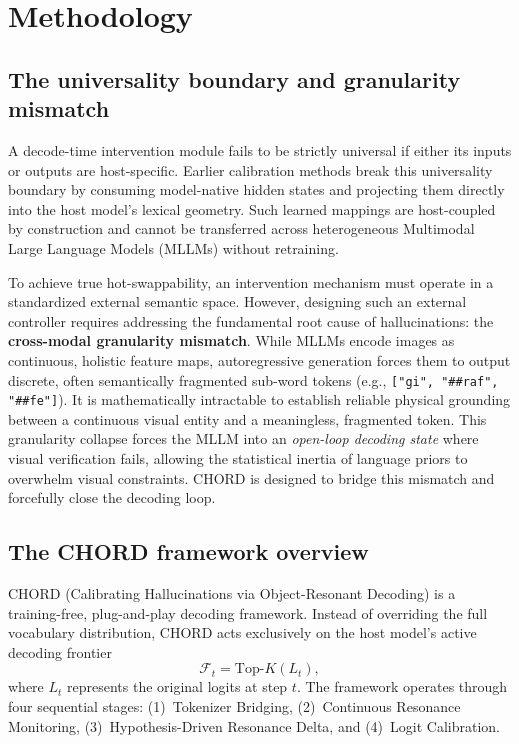\section{Methodology}
\label{sec:method}

\subsection{The universality boundary and granularity mismatch}

A decode-time intervention module fails to be strictly universal if either its inputs or outputs are host-specific. Earlier calibration methods break this universality boundary by consuming model-native hidden states and projecting them directly into the host model's lexical geometry. Such learned mappings are host-coupled by construction and cannot be transferred across heterogeneous Multimodal Large Language Models (MLLMs) without retraining.

To achieve true hot-swappability, an intervention mechanism must operate in a standardized external semantic space. However, designing such an external controller requires addressing the fundamental root cause of hallucinations: the \textbf{cross-modal granularity mismatch}. While MLLMs encode images as continuous, holistic feature maps, autoregressive generation forces them to output discrete, often semantically fragmented sub-word tokens (e.g., \texttt{["gi", "\#\#raf", "\#\#fe"]}). It is mathematically intractable to establish reliable physical grounding between a continuous visual entity and a meaningless, fragmented token. This granularity collapse forces the MLLM into an \emph{open-loop decoding state} where visual verification fails, allowing the statistical inertia of language priors to overwhelm visual constraints. CHORD is designed to bridge this mismatch and forcefully close the decoding loop.

\subsection{The CHORD framework overview}

CHORD (Calibrating Hallucinations via Object-Resonant Decoding) is a training-free, plug-and-play decoding framework. Instead of overriding the full vocabulary distribution, CHORD acts exclusively on the host model's active decoding frontier
\begin{equation}
  \mathcal{F}_t = \mathrm{Top}\text{-}K(L_t),
\end{equation}
where $L_t$ represents the original logits at step $t$. The framework operates through four sequential stages: (1)~Tokenizer Bridging, (2)~Continuous Resonance Monitoring, (3)~Hypothesis-Driven Resonance Delta, and (4)~Logit Calibration.

